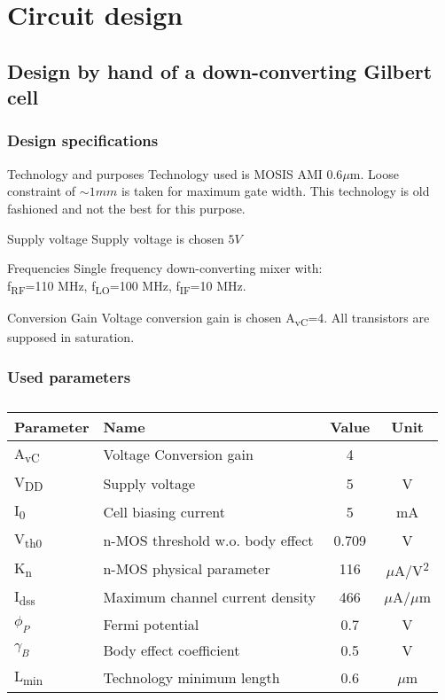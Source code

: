 \section{Circuit design}

\subsection{Design by hand of a down-converting Gilbert cell}
\begin{frame} %
\tableofcontents[currentsubsection]
\end{frame}

\begin{frame}
\frametitle{Design specifications}
\begin{block}{Technology and purposes}
Technology used is MOSIS AMI 0.6$\mu$m. Loose constraint of $\sim 1mm$ is taken for maximum gate width. This technology is old fashioned and not the best for this purpose.
\end{block}

\begin{block}{Supply voltage}
Supply voltage is chosen $5V$ 
\end{block}

\begin{block}{Frequencies}
Single frequency down-converting mixer with: \\ f\textsubscript{RF}=110 MHz, f\textsubscript{LO}=100 MHz, f\textsubscript{IF}=10 MHz.
\end{block}
\begin{block}{Conversion Gain}
Voltage conversion gain is chosen A\textsubscript{vC}=4. All transistors are supposed in saturation.
\end{block}
\end{frame}

\begin{frame}
\frametitle{Used parameters}
\begin{table} [h]
\label{tab:specs}
\caption{}
\centering	
\begin{tabular}{llcc} 
\toprule 
Parameter & Name			& Value 	& Unit \\ 
\midrule
A\textsubscript{vC} & Voltage Conversion gain & 4 & \\
V\textsubscript{DD} & Supply voltage &	5 & V		\\
I\textsubscript{0} & Cell biasing current & 5 & mA \\
V\textsubscript{th0} & n-MOS threshold w.o. body effect& 0.709 &V		\\ 
K\textsubscript{n} & n-MOS physical parameter& 116 & $\mu$A/V\textsuperscript{2}\\
I\textsubscript{dss} & Maximum channel current density & 466 & $\mu$A/$\mu$m \\
$\phi_P$ & Fermi potential & 0.7 & V \\
$\gamma_B$ & Body effect coefficient & 0.5 & V \\
L\textsubscript{min} & Technology minimum length & 0.6 & $\mu$m \\
\bottomrule 
\end{tabular}	
\end{table}	
\end{frame}

